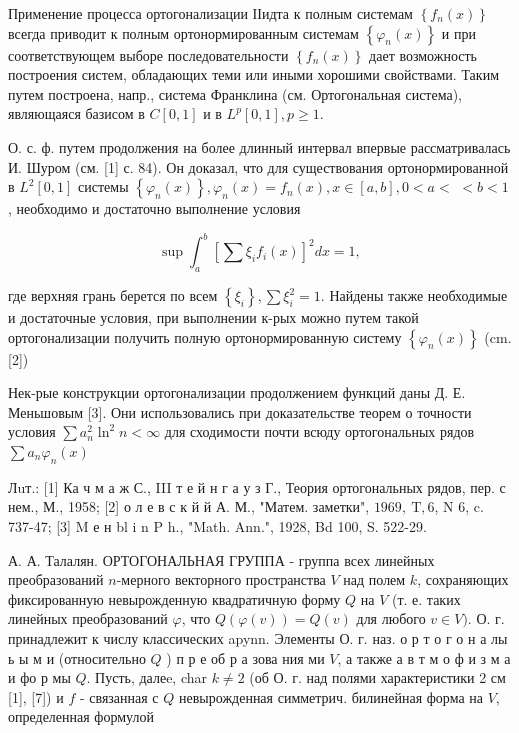 \documentclass[10pt]{article}
\begin{document}
Применение процесса ортогонализации ІІидта к полным системам $\left\{f_{n}(x)\right\}$ всегда приводит к полным ортонормированным системам $\left\{\varphi_{n}(x)\right\}$ и при соответствующем выборе последовательности $\left\{f_{n}(x)\right\}$ дает возможность построения систем, обладающих теми или иными хорошими свойствами. Таким путем построена, напр., система Франклина (см. Ортогональная система), являющаяся базисом в $C[0,1]$ и в $L^{p}[0,1], p \geqslant 1$.



О. с. ф. путем продолжения на более длинный интервал впервые рассматривалась И. Шуром (см. [1] с. 84). Он доказал, что для существования ортонормированной в $L^{2}[0,1]$ системы $\left\{\varphi_{n}(x)\right\}, \varphi_{n}(x)=f_{n}(x), x \in[a, b], 0<a<$ $<b<1$, необходимо и достаточно выполнение условия



\[

\sup \int_{a}^{b}\left[\sum \xi_{i} f_{i}(x)\right]^{2} d x=1,

\]



где верхняя грань берется по всем $\left\{\xi_{i}\right\}, \sum \xi_{i}^{2}=1$. Найдены также необходимые и достаточные условия, при выполнении к-рых можно путем такой ортогонализации получить полную ортонормированную систему $\left\{\varphi_{n}(x)\right\}$ (cm. [2])



Нек-рые конструкции ортогонализации продолжением функций даны Д. Е. Меньшовым [3]. Они использовались при доказательстве теорем о точности условия $\sum a_{n}^{2} \ln ^{2} n<\infty$ для сходимости почти всюду ортогональных рядов $\sum a_{n} \varphi_{n}(x)$



Лuт.: [1] Ка ч м а ж С., III т е й н г а у з Г., Теория ортогональных рядов, пер. с нем., М., 1958; [2] о л е в с к й й А. М., "Матем. заметки", $1969, \mathrm{~T}, 6$, N 6, c. 737-47; [3] M е н bl i n P h., "Math. Ann.", 1928, Bd 100, S. 522-29.



А. А. Талалян. ОРТОГОНАЛЬНАЯ ГРУППА - группа всех линейных преобразований $n$-мерного векторного пространства $V$ над полем $k$, сохраняющих фиксированную невырожденную квадратичную форму $Q$ на $V$ (т. е. таких линейных преобразований $\varphi$, что $Q(\varphi(v))=Q(v)$ для любого $v \in V)$. О. г. принадлежит к числу классических apynn. Элементы О. г. наз. о р т о г о н а лы ь ы м и (относительно $Q$ ) п р е об р а зова ния ми $V$, а также а в т м о ф и з м а и фо р мы $Q$. Пусть, далеe, char $k \neq 2$ (об О. г. над полями характеристики 2 см [1], [7]) и $f$ - связанная с $Q$ невырожденная симметрич. билинейная форма на $V$, определенная формулой
\end{document}
